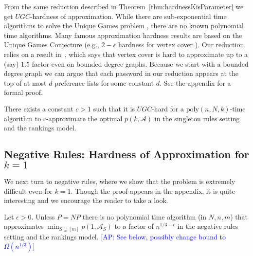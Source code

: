 \documentclass[prodmode,acmec]{ec-acmsmall}
\newcommand{\kibitz}[2]{\ifnum\Comments=1\textcolor{#1}{#2}\fi}
\newcommand{\ap}[1]{\kibitz{blue} {[AP: #1]}}
\newcommand{\poly}{\ensuremath{\mathrm{poly}}}
\begin{document}
From the same reduction described in Theorem~\ref{thm:hardnessKisParameter} we get $UGC$-hardness of approximation. While there are sub-exponential time algorithms to solve the Unique Games problem \cite{arora2010subexponential}, there are no known polynomial time algorithms. Many famous approximation hardness results are based on the Unique Games Conjecture (e.g., $2-\epsilon$ hardness for vertex cover \cite{khot2008vertex}). Our reduction relies on a result in~\cite{AustrinKS11}, which says that vertex cover is hard to approximate up to a (say) $1.5$-factor even on bounded degree graphs. Because we start with a bounded degree graph we can argue that each password in our reduction appears at the top of at most $d$ preference-lists for some constant $d$. See the appendix for a formal proof.
\newcommand{\thmUGCHardness}{There exists a constant $c>1$ such that it is $UGC$-hard for a $\poly(n,N,k)$-time algorithm to $c$-approximate the optimal $p(k,\mathcal{A})$ in the singleton rules setting and the rankings model.}
\begin{theorem} \label{thm:UGCHardness}
\thmUGCHardness
\end{theorem}



\subsection{Negative Rules: Hardness of Approximation for $k=1$} \label{subsec:HardnessOfApproximatingOptimalCombinationOfSubsets}



We next turn to negative rules, where we show that the problem is extremely difficult even for $k=1$. Though the proof appears in the appendix, it is quite interesting and we encourage the reader to take a look.



\begin{theorem}\label{thm:HardnessOfApproximationOptimalCombinationOfSubsets}
Let $\epsilon > 0$. Unless $P=NP$ there is no polynomial time algorithm (in $N,n,m$) that approximates $\min_{S\subseteq [m]} p(1,\mathcal{A}_S)$ to a factor of $n^{1/3-\epsilon}$ in the negative rules setting and the rankings model. \ap{See below, possibly change bound to $\Omega(n^{1/3})$}
\end{theorem}
\end{document}
